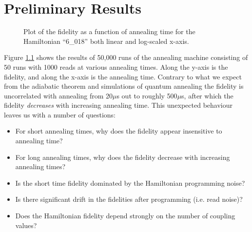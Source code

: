 \chapter{Preliminary Results}
\label{chap:prelim}

\begin{figure}
	\caption[Fidelity vs Time]{Plot of the fidelity as a function of annealing time for the Hamiltonian ``6\_018'' both linear and log-scaled x-axis.}
	\label{fig:fidelity}
\end{figure}

Figure \ref{fig:fidelity} shows the results of 50,000 runs of the annealing machine consisting of 50 runs with 1000 reads at various annealing times.  Along the y-axis is the fidelity, and along the x-axis is the annealing time.  Contrary to what we expect from the adiabatic theorem and simulations of quantum annealing the fidelity is uncorrelated with annealing from 20$\mu$s out to roughly 500$ \mu$s, after which the fidelity \emph{decreases} with increasing annealing time.  This unexpected behaviour leaves us with a number of questions:

\begin{itemize}
	\item For short annealing times, why does the fidelity appear insensitive to annealing time?
	\item For long annealing times, why does the fidelity decrease with increasing annealing times?
	\item Is the short time fidelity dominated by the Hamiltonian programming noise?
	\item Is there significant drift in the fidelities after programming (i.e. read noise)?
	\item Does the Hamiltonian fidelity depend strongly on the number of coupling values?
\end{itemize}

